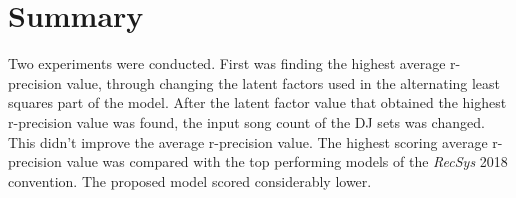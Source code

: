 \section{Summary}
Two experiments were conducted. First was finding the highest average r-precision value, through changing the latent factors used in the alternating least squares part of the model. After the latent factor value that obtained the highest r-precision value was found, the input song count of the DJ sets was changed. This didn't improve the average r-precision value. The highest scoring average r-precision value was compared with the top performing models of the \textit{RecSys} 2018 convention. The proposed model scored considerably lower. 
